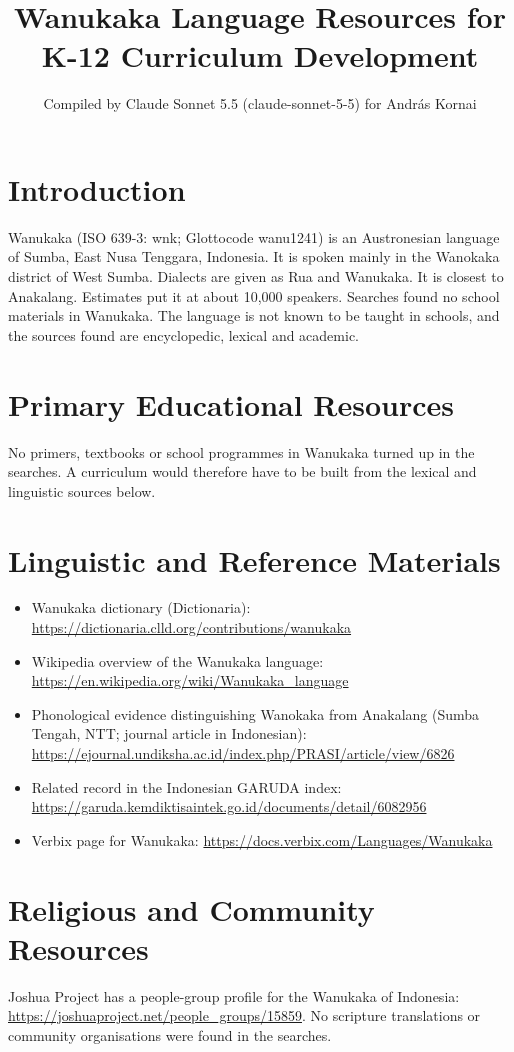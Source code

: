 \documentclass[12pt]{article}
\title{Wanukaka Language Resources for K-12 Curriculum Development}
\author{Compiled by Claude Sonnet 5.5 (claude-sonnet-5-5) for Andr\'as Kornai}
\date{}
\begin{document}
\maketitle

\section{Introduction}
Wanukaka (ISO 639-3: wnk; Glottocode wanu1241) is an Austronesian language of Sumba, East Nusa Tenggara, Indonesia. It is spoken mainly in the Wanokaka district of West Sumba. Dialects are given as Rua and Wanukaka. It is closest to Anakalang. Estimates put it at about 10,000 speakers. Searches found no school materials in Wanukaka. The language is not known to be taught in schools, and the sources found are encyclopedic, lexical and academic.

\section{Primary Educational Resources}
No primers, textbooks or school programmes in Wanukaka turned up in the searches. A curriculum would therefore have to be built from the lexical and linguistic sources below.

\section{Linguistic and Reference Materials}
\begin{itemize}
\item Wanukaka dictionary (Dictionaria): \url{https://dictionaria.clld.org/contributions/wanukaka}
\item Wikipedia overview of the Wanukaka language: \url{https://en.wikipedia.org/wiki/Wanukaka_language}
\item Phonological evidence distinguishing Wanokaka from Anakalang (Sumba Tengah, NTT; journal article in Indonesian): \url{https://ejournal.undiksha.ac.id/index.php/PRASI/article/view/6826}
\item Related record in the Indonesian GARUDA index: \url{https://garuda.kemdiktisaintek.go.id/documents/detail/6082956}
\item Verbix page for Wanukaka: \url{https://docs.verbix.com/Languages/Wanukaka}
\end{itemize}

\section{Religious and Community Resources}
Joshua Project has a people-group profile for the Wanukaka of Indonesia: \url{https://joshuaproject.net/people_groups/15859}. No scripture translations or community organisations were found in the searches.
\end{document}
